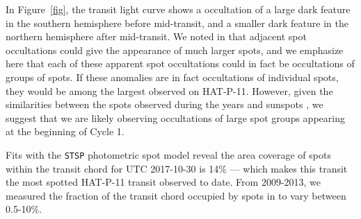

In Figure~\ref{fig}, the transit light curve shows a occultation of a large dark feature in the southern hemisphere before mid-transit, and a smaller dark feature in the northern hemisphere after mid-transit. We noted in \citet{Morris2017a} that adjacent spot occultations could give the appearance of much larger spots, and we emphasize here that each of these apparent spot occultations could in fact be occultations of groups of spots.  If these anomalies are in fact occultations of individual spots, they would be among the largest observed on HAT-P-11. However, given the similarities between the spots observed during the \kepler years \citep{Morris2017a} and sunspots \citep{Solanki2003}, we suggest that we are likely observing occultations of large spot groups appearing at the beginning of Cycle 1. 

Fits with the \texttt{STSP} photometric spot model \citep{Morris2017a, Hebb2018} reveal the area coverage of spots within the transit chord for UTC 2017-10-30 is 14\% --- which makes this transit the most spotted HAT-P-11 transit observed to date. From 2009-2013, we measured the fraction of the transit chord occupied by spots in \citet{Morris2017a} to vary between 0.5-10\%. 

